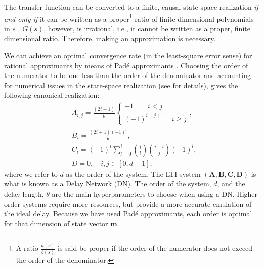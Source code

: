 \documentclass{article}
\def\vm{{\bm{m}}}
\def\mA{{\bm{A}}}
\def\mB{{\bm{B}}}
\def\mC{{\bm{C}}}
\def\mD{{\bm{D}}}
\begin{document}
The transfer function can be converted to a finite, causal state space realization \textit{if and only if} it can be written as a proper\footnote{A ratio $\frac{a(s)}{b(s)}$ is said be proper if the order of the numerator does not exceed the order of the denominator.} ratio of finite dimensional polynomials in $s$ \cite{brogan1991modern}. $G(s)$, however, is irrational, i.e., it cannot be written as a proper, finite dimensional ratio.  Therefore,  making an approximation is necessary.

We can achieve an optimal convergence rate (in the least-square error sense) for rational approximants by means of Padé approximants \cite{partington2004some}. Choosing the order of the numerator to be one less than the order of the denominator and accounting for numerical issues in the state-space realization (see \citet{voelker2018improving} for details), gives the following canonical realization:
\begin{align}
    & A_{i,j} = \frac{(2i + 1)}{\theta}\begin{cases} -1 \qquad i < j\\ (-1)^{i-j+1} \quad i \geq j \end{cases}, \label{A_cont}\\
    & B_{i} = \frac{(2i+1)(-1)^{i}}{\theta}, \label{B_cont}\\
    & C_{i} = (-1)^{i} \sum_{l=0}^{i} {i \choose l} {i + l \choose j}(-1)^{l},\label{C matrix}\\
    &D = 0, \quad i, j \in [0, d-1],
\end{align}
where we refer to $d$ as the order of the system. The LTI system $(\mA, \mB, \mC, \mD)$ is what is known as a Delay Network (DN). The order of the system, $d$, and the delay length, $\theta$ are the main hyperparameters to choose when using a DN. Higher order systems require more resources, but provide a more accurate emulation of the ideal delay. Because we have used Padé approximants, each order is optimal for that dimension of state vector $\vm$.
\end{document}
